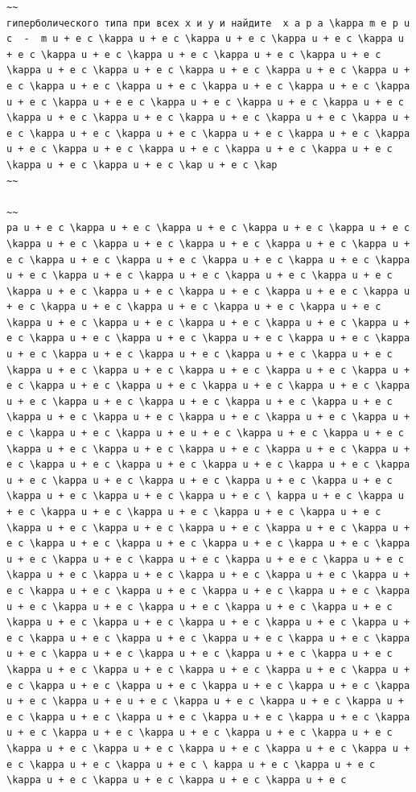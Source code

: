 \documentclass[
  ukrainian,
]{article}
\begin{document}
\begin{verbatim}
~~
гиперболического типа при всех x и y и найдите  x a p a \kappa m e p u c  -  m u + e c \kappa u + e c \kappa u + e c \kappa u + e c \kappa u + e c \kappa u + e c \kappa u + e c \kappa u + e c \kappa u + e c \kappa u + e c \kappa u + e c \kappa u + e c \kappa u + e c \kappa u + e c \kappa u + e c \kappa u + e c \kappa u + e c \kappa u + e c \kappa u + e c \kappa u + e e c \kappa u + e c \kappa u + e c \kappa u + e c \kappa u + e c \kappa u + e c \kappa u + e c \kappa u + e c \kappa u + e c \kappa u + e c \kappa u + e c \kappa u + e c \kappa u + e c \kappa u + e c \kappa u + e c \kappa u + e c \kappa u + e c \kappa u + e c \kappa u + e c \kappa u + e c \kap u + e c \kap
~~

~~
pa u + e c \kappa u + e c \kappa u + e c \kappa u + e c \kappa u + e c \kappa u + e c \kappa u + e c \kappa u + e c \kappa u + e c \kappa u + e c \kappa u + e c \kappa u + e c \kappa u + e c \kappa u + e c \kappa u + e c \kappa u + e c \kappa u + e c \kappa u + e c \kappa u + e c \kappa u + e c \kappa u + e c \kappa u + e c \kappa u + e e c \kappa u + e c \kappa u + e c \kappa u + e c \kappa u + e c \kappa u + e c \kappa u + e c \kappa u + e c \kappa u + e c \kappa u + e c \kappa u + e c \kappa u + e c \kappa u + e c \kappa u + e c \kappa u + e c \kappa u + e c \kappa u + e c \kappa u + e c \kappa u + e c \kappa u + e c \kappa u + e c \kappa u + e c \kappa u + e c \kappa u + e c \kappa u + e c \kappa u + e c \kappa u + e c \kappa u + e c \kappa u + e c \kappa u + e c \kappa u + e c \kappa u + e c \kappa u + e c \kappa u + e c \kappa u + e c \kappa u + e c \kappa u + e c \kappa u + e c \kappa u + e c \kappa u + e c \kappa u + e u + e c \kappa u + e c \kappa u + e c \kappa u + e c \kappa u + e c \kappa u + e c \kappa u + e c \kappa u + e c \kappa u + e c \kappa u + e c \kappa u + e c \kappa u + e c \kappa u + e c \kappa u + e c \kappa u + e c \kappa u + e c \kappa u + e c \kappa u + e c \kappa u + e c \kappa u + e c \ kappa u + e c \kappa u + e c \kappa u + e c \kappa u + e c \kappa u + e c \kappa u + e c \kappa u + e c \kappa u + e c \kappa u + e c \kappa u + e c \kappa u + e c \kappa u + e c \kappa u + e c \kappa u + e c \kappa u + e c \kappa u + e c \kappa u + e c \kappa u + e c \kappa u + e e c \kappa u + e c \kappa u + e c \kappa u + e c \kappa u + e c \kappa u + e c \kappa u + e c \kappa u + e c \kappa u + e c \kappa u + e c \kappa u + e c \kappa u + e c \kappa u + e c \kappa u + e c \kappa u + e c \kappa u + e c \kappa u + e c \kappa u + e c \kappa u + e c \kappa u + e c \kappa u + e c \kappa u + e c \kappa u + e c \kappa u + e c \kappa u + e c \kappa u + e c \kappa u + e c \kappa u + e c \kappa u + e c \kappa u + e c \kappa u + e c \kappa u + e c \kappa u + e c \kappa u + e c \kappa u + e c \kappa u + e c \kappa u + e c \kappa u + e c \kappa u + e c \kappa u + e c \kappa u + e u + e c \kappa u + e c \kappa u + e c \kappa u + e c \kappa u + e c \kappa u + e c \kappa u + e c \kappa u + e c \kappa u + e c \kappa u + e c \kappa u + e c \kappa u + e c \kappa u + e c \kappa u + e c \kappa u + e c \kappa u + e c \kappa u + e c \kappa u + e c \kappa u + e c \kappa u + e c \ kappa u + e c \kappa u + e c \kappa u + e c \kappa u + e c \kappa u + e c \kappa u + e c 
\end{verbatim}
\end{document}
